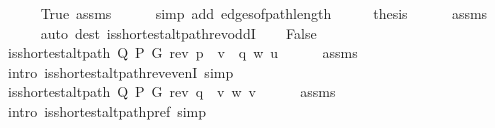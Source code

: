 \begin{isabellebody}
\ \ \ \ \isamarkupfalse%
\ True\ assms{\isacharparenleft}{\kern0pt}{}{\isacharparenright}{\kern0pt}\isanewline
\ \ \ \ \isamarkupfalse%
\ {\isacharparenleft}{\kern0pt}simp\ add{\isacharcolon}{\kern0pt}\ edges{\isacharunderscore}{\kern0pt}of{\isacharunderscore}{\kern0pt}path{\isacharunderscore}{\kern0pt}length{\isacharparenright}{\kern0pt}\isanewline
\ \ \isamarkupfalse%
\ \isamarkupfalse%
\ {\isacharquery}{\kern0pt}thesis\isanewline
\ \ \ \ \isamarkupfalse%
\ assms{\isacharparenleft}{\kern0pt}{}{\isacharparenright}{\kern0pt}\isanewline
\ \ \ \ \isamarkupfalse%
\ {\isacharparenleft}{\kern0pt}auto\ dest{\isacharcolon}{\kern0pt}\ is{\isacharunderscore}{\kern0pt}shortest{\isacharunderscore}{\kern0pt}alt{\isacharunderscore}{\kern0pt}path{\isacharunderscore}{\kern0pt}rev{\isacharunderscore}{\kern0pt}oddI{\isacharparenright}{\kern0pt}\isanewline
{}\isamarkupfalse%
\isanewline
\ \ \isamarkupfalse%
\ False\isanewline
\ \ \isamarkupfalse%
\ {\isachardoublequoteopen}is{\isacharunderscore}{\kern0pt}shortest{\isacharunderscore}{\kern0pt}alt{\isacharunderscore}{\kern0pt}path\ Q\ P\ G\ {\isacharparenleft}{\kern0pt}rev\ {\isacharparenleft}{\kern0pt}p\ {\isacharat}{\kern0pt}\ v\ {\isacharhash}{\kern0pt}\ q{\isacharparenright}{\kern0pt}{\isacharparenright}{\kern0pt}\ w\ u{\isachardoublequoteclose}\isanewline
\ \ \ \ \isamarkupfalse%
\ assms{\isacharparenleft}{\kern0pt}{}{\isacharcomma}{\kern0pt}\ {}{\isacharparenright}{\kern0pt}\isanewline
\ \ \ \ \isamarkupfalse%
\ {\isacharparenleft}{\kern0pt}intro\ is{\isacharunderscore}{\kern0pt}shortest{\isacharunderscore}{\kern0pt}alt{\isacharunderscore}{\kern0pt}path{\isacharunderscore}{\kern0pt}rev{\isacharunderscore}{\kern0pt}evenI{\isacharparenright}{\kern0pt}\ simp{\isacharplus}{\kern0pt}\isanewline
\ \ \isamarkupfalse%
\ {\isachardoublequoteopen}is{\isacharunderscore}{\kern0pt}shortest{\isacharunderscore}{\kern0pt}alt{\isacharunderscore}{\kern0pt}path\ Q\ P\ G\ {\isacharparenleft}{\kern0pt}rev\ q\ {\isacharat}{\kern0pt}\ {\isacharbrackleft}{\kern0pt}v{\isacharbrackright}{\kern0pt}{\isacharparenright}{\kern0pt}\ w\ v{\isachardoublequoteclose}\isanewline
\ \ \ \ \isamarkupfalse%
\ assms{\isacharparenleft}{\kern0pt}{}{\isacharparenright}{\kern0pt}\isanewline
\ \ \ \ \isamarkupfalse%
\ {\isacharparenleft}{\kern0pt}intro\ is{\isacharunderscore}{\kern0pt}shortest{\isacharunderscore}{\kern0pt}alt{\isacharunderscore}{\kern0pt}path{\isacharunderscore}{\kern0pt}pref{\isacharparenright}{\kern0pt}\ simp\isanewline

\end{isabellebody}

